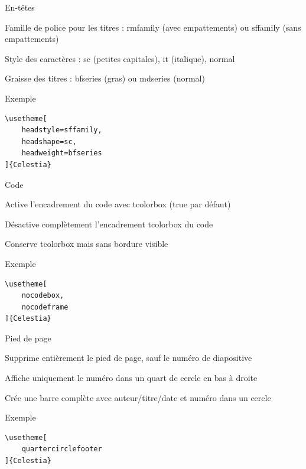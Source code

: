 \documentclass[%
    10pt,
    french,
    aspectratio=1610,
    xcolor=svgnames
]{beamer}
\begin{document}
\begin{frame}[fragile]{En-têtes}
    \begin{description}[headweight]
        \item[headstyle] Famille de police pour les titres : \alert{rmfamily} (avec empattements) ou \alert{sffamily} (sans empattements)
        \item[headshape] Style des caractères : \alert{sc} (petites capitales), \alert{it} (italique), \alert{normal}
        \item[headweight] Graisse des titres : \alert{bfseries} (gras) ou \alert{mdseries} (normal)
    \end{description}

    \begin{exampleblock}{Exemple}
        \begin{lstlisting}[style=latex]
\usetheme[
    headstyle=sffamily,
    headshape=sc,
    headweight=bfseries
]{Celestia}
        \end{lstlisting}
    \end{exampleblock}
\end{frame}

\begin{frame}[fragile]{Code}
    \begin{description}[nocodeframe]
        \item[codebox] Active l'encadrement du code avec \alert{tcolorbox} (\alert{true} par défaut)
        \item[nocodebox] Désactive complètement l'encadrement \alert{tcolorbox} du code
        \item[nocodeframe] Conserve \alert{tcolorbox} mais sans bordure visible
    \end{description}

    \begin{exampleblock}{Exemple}
        \begin{lstlisting}[style=latex]
\usetheme[
    nocodebox,
    nocodeframe
]{Celestia}
        \end{lstlisting}
    \end{exampleblock}
\end{frame}

\begin{frame}[fragile]{Pied de page}
    \begin{description}[quartercirclefooter]
        \item[nofooter] Supprime entièrement le pied de page, sauf le numéro de diapositive
        \item[quartercirclefooter] Affiche uniquement le numéro dans un quart de cercle en bas à droite
        \item[fullbarfooter] Crée une barre complète avec auteur/titre/date et numéro dans un cercle
    \end{description}

    \begin{exampleblock}{Exemple}
        \begin{lstlisting}[style=latex]
\usetheme[
    quartercirclefooter
]{Celestia}
        \end{lstlisting}
    \end{exampleblock}
\end{frame}
\end{document}
